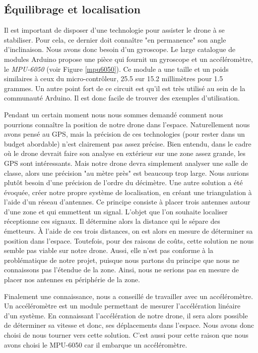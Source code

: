 \documentclass[a4paper,10pt]{report}
\begin{document}
      \subsection{Équilibrage et localisation}
	Il est important de disposer d'une technologie pour assister le drone à 
se stabiliser. Pour cela, ce dernier doit connaître "en permanence" son angle 
d'inclinaison. Nous avons donc besoin d'un gyroscope. Le large catalogue de 
modules Arduino propose une pièce qui fournit un gyroscope et un 
accéléromètre, le \textit{MPU-6050} (voir Figure \ref{mpu6050}). Ce module a 
une taille et un poids similaires à ceux du micro-contrôleur, 25.5 sur 15.2 
millimètres pour 1.5 grammes. Un autre point fort de ce circuit est qu'il est 
très utilisé au sein de la communauté Arduino. Il est donc facile de trouver 
des exemples d'utilisation.
	
	Pendant un certain moment nous nous sommes demandé comment nous 
pourrions connaître la position de notre drone dans l'espace. Naturellement 
nous avons pensé au GPS, mais la précision de ces technologies (pour rester 
dans 
un budget abordable) n'est clairement pas assez précise. Bien entendu, dans le 
cadre où le drone devrait faire son analyse en extérieur sur une zone assez 
grande, les GPS sont intéressants. Mais notre drone devra simplement analyser 
une salle de classe, alors une précision "au mètre près" est beaucoup trop 
large. Nous aurions plutôt besoin d'une précision de l’ordre du décimètre.  Une 
autre solution a été évoquée, créer notre propre système de localisation, en 
créant une triangulation\cite{triangulation} à l’aide d’un réseau d’antennes. 
Ce principe consiste à placer trois antennes autour d'une zone et qui emmettent 
un signal.
L'objet que l'on souhaite localiser réceptionne ces signaux. Il détermine alors 
la distance qui le sépare des émetteurs. À l'aide de ces trois distances, on 
est alors en mesure de déterminer sa position dans l'espace. Toutefois, pour 
des raisons de coûts, cette solution ne nous semble pas viable sur notre drone. 
Aussi, elle n'est pas conforme à la problématique de notre projet, puisque nous 
partons du principe que nous ne connaissons pas l'étendue de la zone. Ainsi, 
nous ne serions pas en mesure de placer nos antennes en périphérie de la zone.

	Finalement une connaissance, nous a conseillé de travailler avec un 
accéléromètre. Un accéléromètre est un module permettant de mesurer 
l'accélération linéaire d’un système. En connaissant l'accélération de notre 
drone, il sera alors possible de déterminer sa vitesse et donc, ses 
déplacements 
dans l’espace. Nous avons donc choisi de nous tourner vers cette solution. 
C'est aussi pour cette raison que nous avons choisi le MPU-6050 car il embarque 
un accéléromètre.
	
\end{document}
